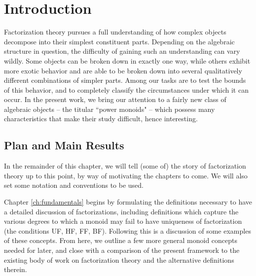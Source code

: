 \chapter{Introduction} \label{ch:intro}

Factorization theory pursues a full understanding of how complex objects decompose into their simplest constituent parts.  
Depending on the algebraic structure in question, the difficulty of gaining such an understanding can vary wildly. 
Some objects can be broken down in exactly one way, while others exhibit more exotic behavior and are able to be broken down into several qualitatively different combinations of simpler parts.
Among our tasks are to test the bounds of this behavior, and to completely classify the circumstances under which it can occur.
In the present work, we bring our attention to a fairly new class of algebraic objects -- the titular ``power monoids" --  which possess many characteristics that make their study difficult, hence interesting.

\section{Plan and Main Results}
In the remainder of this chapter, we will tell (some of) the story of factorization theory up to this point, by way of motivating the chapters to come.  
We will also set some notation and conventions to be used.

Chapter \ref{ch:fundamentals} begins by formulating the definitions necessary to have a detailed discussion of factorizations, including definitions which capture the various degrees to which a monoid may fail to have uniqueness of factorization (the conditions UF, HF, FF, BF).
Following this is a discussion of some examples of these concepts.
From here, we outline a few more general monoid concepts needed for later, and close with a comparison of the present framework to the existing body of work on factorization theory and the alternative definitions therein.

